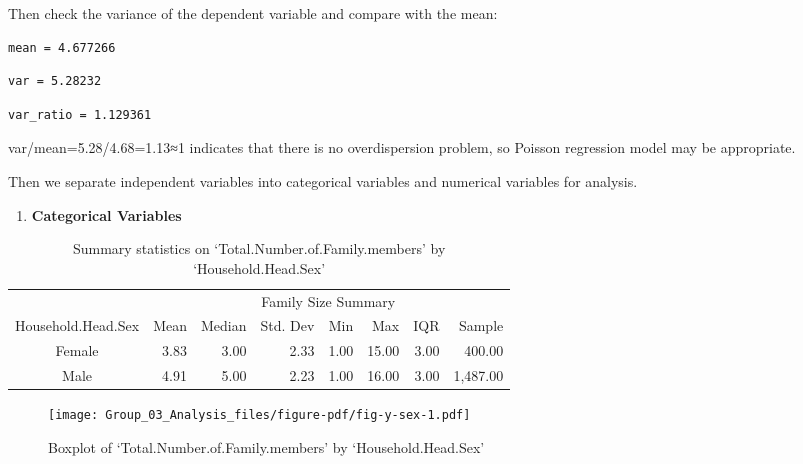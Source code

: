 \documentclass[
]{article}
\providecommand{\tightlist}{%
  \setlength{\itemsep}{0pt}\setlength{\parskip}{0pt}}\usepackage{longtable,booktabs,array}
\begin{document}
Then check the variance of the dependent variable and compare with the
mean:

\begin{verbatim}
mean = 4.677266 
\end{verbatim}

\begin{verbatim}
var = 5.28232 
\end{verbatim}

\begin{verbatim}
var_ratio = 1.129361 
\end{verbatim}

var/mean=5.28/4.68=1.13≈1 indicates that there is no overdispersion
problem, so Poisson regression model may be appropriate.

Then we separate independent variables into categorical variables and
numerical variables for analysis.

\begin{enumerate}
\def\labelenumi{\arabic{enumi}.}
\tightlist
\item
  \textbf{Categorical Variables}
\end{enumerate}

\hypertarget{tbl-y-sex}{}
\begin{table}
\caption{\label{tbl-y-sex}Summary statistics on `Total.Number.of.Family.members' by
`Household.Head.Sex' }\tabularnewline

\fontsize{9.0pt}{10.8pt}\selectfont
\begin{tabular*}{0.9\linewidth}{@{\extracolsep{\fill}}crrrrrrr}
\toprule
 & \multicolumn{7}{c}{Family Size Summary} \\ 
\cmidrule(lr){2-8}
Household.Head.Sex & Mean & Median & Std. Dev & Min & Max & IQR & Sample \\ 
\midrule\addlinespace[2.5pt]
Female & 3.83 & 3.00 & 2.33 & 1.00 & 15.00 & 3.00 & 400.00 \\ 
Male & 4.91 & 5.00 & 2.23 & 1.00 & 16.00 & 3.00 & 1,487.00 \\ 
\bottomrule
\end{tabular*}
\end{table}

\begin{figure}[H]

{\centering \texttt{[image: Group\_03\_Analysis\_files/figure-pdf/fig-y-sex-1.pdf]}

}

\caption{\label{fig-y-sex}Boxplot of `Total.Number.of.Family.members' by
`Household.Head.Sex'}

\end{figure}
\end{document}
